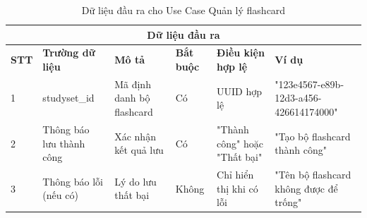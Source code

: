 \documentclass[../DoAn.tex]{subfiles}
\begin{document}
\vspace{0.5cm}

\begin{table}[h!]
\centering
\begin{tabular}{|m{1cm}|m{2.5cm}|m{3cm}|m{1cm}|m{2.5cm}|m{3.5cm}|}
    \hline
    \multicolumn{6}{|c|}{\textbf{Dữ liệu đầu ra}} \\
    \hline
    \textbf{STT} & \textbf{Trường dữ liệu} & \textbf{Mô tả} & \textbf{Bắt buộc} & \textbf{Điều kiện hợp lệ} & \textbf{Ví dụ} \\
    \hline
    1 & studyset\_id & Mã định danh bộ flashcard & Có & UUID hợp lệ & "123e4567-e89b-12d3-a456-426614174000" \\
    \hline
    2 & Thông báo lưu thành công & Xác nhận kết quả lưu & Có & "Thành công" hoặc "Thất bại" & "Tạo bộ flashcard thành công" \\
    \hline
    3 & Thông báo lỗi (nếu có) & Lý do lưu thất bại & Không & Chỉ hiển thị khi có lỗi & "Tên bộ flashcard không được để trống" \\
    \hline
\end{tabular}
\caption{Dữ liệu đầu ra cho Use Case Quản lý flashcard}
\end{table}

\vspace{1cm}

\end{document}
